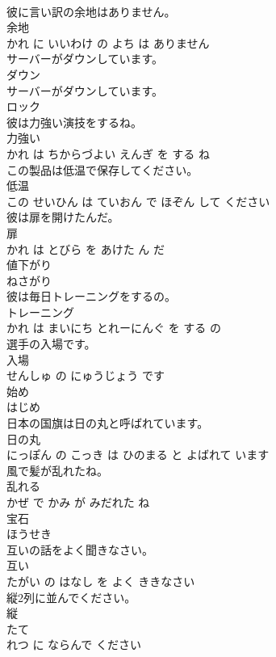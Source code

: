 \documentclass[8pt]{extreport}
\begin{document}
\begin{CJK}{UTF8}{min}
\\	彼に言い訳の余地はありません。	
\\	余地 
\\	かれ に いいわけ の よち は ありません			
\\	サーバーがダウンしています。	
\\	ダウン 
\\	サーバーがダウンしています。			
\\	ロック	
\\	彼は力強い演技をするね。	
\\	力強い 
\\	かれ は ちからづよい えんぎ を する ね			
\\	この製品は低温で保存してください。	
\\	低温 
\\	この せいひん は ていおん で ほぞん して ください			
\\	彼は扉を開けたんだ。	
\\	扉 
\\	かれ は とびら を あけた ん だ			
\\	値下がり	
\\	ねさがり			
\\	彼は毎日トレーニングをするの。	
\\	トレーニング 
\\	かれ は まいにち とれーにんぐ を する の			
\\	選手の入場です。	
\\	入場 
\\	せんしゅ の にゅうじょう です			
\\	始め	
\\	はじめ			
\\	日本の国旗は日の丸と呼ばれています。	
\\	日の丸 
\\	にっぽん の こっき は ひのまる と よばれて います			
\\	風で髪が乱れたね。	
\\	乱れる 
\\	かぜ で かみ が みだれた ね			
\\	宝石	
\\	ほうせき			
\\	互いの話をよく聞きなさい。	
\\	互い 
\\	たがい の はなし を よく ききなさい			
\\	縦2列に並んでください。	
\\	縦 
\\	たて 
\\	れつ に ならんで ください			

\end{CJK}
\end{document}
